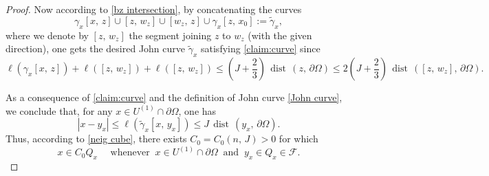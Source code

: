 \documentclass[reqno,11pt]{amsart}
\def\dist{{\mathop\mathrm{\,dist\,}}}
\numberwithin{equation}{section}
\theoremstyle{remark}
\begin{document}
\begin{proof}
Now according to \eqref{bz intersection}, by concatenating the curves 
$$\gamma_x[x,\,z] \cup [z,\,w_z]\cup [w_z,\,z]\cup \gamma_x{}[z,\,x_0]:=\tilde\gamma_x,$$
where we denote by $[z,\,w_z]$ the segment joining $z$ to $w_z$ (with the given direction), one gets the desired John curve $\tilde \gamma_x$ satisfying \eqref{claim:curve} since
$$\ell(\gamma_x[x,\,z]) + \ell([z,\,w_z]) + \ell([z,\,w_z])\le  \left(J+\frac 2 3\right) \dist(z,\,\partial\Omega)\le 2\left(J+\frac 2 3\right)\dist([z,\,w_z],\,\partial \Omega). $$ 



 
As a consequence of \eqref{claim:curve} and the definition of John curve \eqref{John curve}, we conclude that, for any $x\in U^{(1)}\cap \partial \Omega$, one has
$$|x-y_x|\le \ell(\tilde\gamma_x[x,\,y_x])\le J \dist(y_x,\,\partial\Omega).$$
Thus, according to \eqref{neig cube}, there exists $C_0=C_0(n,\,J)>0$ for which
\begin{equation}\label{Q cover boundary}
    x\in C_0 Q_x \quad \text{ whenever } \  x\in U^{(1)}\cap \partial \Omega \ \text{ and } \  y_x\in Q_x\in \mathscr F. 
\end{equation}






  

\end{proof}
\end{document}
